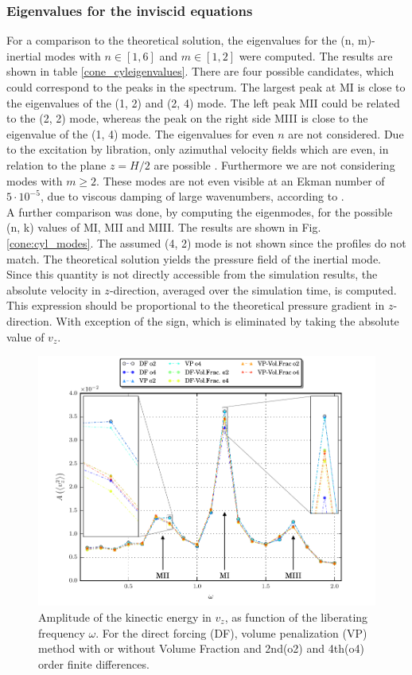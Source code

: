 \subsubsection{Eigenvalues for the inviscid equations}

For a comparison to the theoretical solution, the eigenvalues for the (n, m)-inertial modes with $n\in[1,6]$ and $m\in[1, 2]$ were computed.
The results are shown in table \ref{cone_cyleigenvalues}.
There are four possible candidates,  which could correspond to the peaks in the spectrum.
The largest peak at M\RN{1} is close to the eigenvalues of the (1, 2) and (2, 4) mode.
The left peak  M\RN{2} could be related to the (2, 2) mode,  whereas the peak on the right side M\RN{3} is close to the eigenvalue of the (1, 4) mode.
The eigenvalues for even $n$ are not considered. Due to the excitation by libration,  only azimuthal velocity fields which are even,
in relation to the plane $z=H/2$ are possible \citep{Sauret2012}.
Furthermore we are not considering modes with $m\geq2$. These modes are not even visible at an Ekman number of $5\cdot10^{-5}$,
due to viscous damping of large wavenumbers, according to \citep{Sauret2012}.\\
A further comparison was done, by computing the eigenmodes, for the possible (n, k) values of M\RN{1}, M\RN{2} and M\RN{3}.
The results are shown in Fig. \ref{cone:cyl_modes}.
The assumed (4, 2) mode is not shown since the profiles do not match.
The theoretical solution yields the pressure field of the inertial mode.
Since this quantity is not directly accessible from the simulation results,
the absolute velocity in $z$-direction, averaged over the simulation time, is computed.
This expression should be proportional to the theoretical pressure gradient in $z$-direction.
With exception of the sign, which is eliminated by taking the absolute value of $v_z$.
\clearpage
\begin{figure}[!t]
  \centering
  \includegraphics{gfx/cone/cylinder/cylinder.pdf}  \caption{\label{fig:cone:cyl}
    Amplitude of the kinectic energy in $v_z$, as function of the liberating frequency $\omega$.
   For the direct forcing (DF), volume penalization (VP) method with or without Volume Fraction and
      2nd(o2)  and 4th(o4) order finite differences.}
\end{figure}

